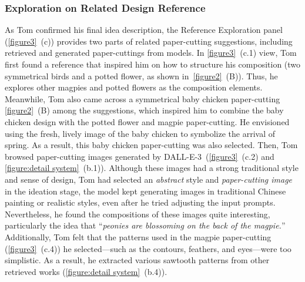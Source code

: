 \subsubsection{Exploration on Related Design Reference}
As Tom confirmed his final idea description, the Reference Exploration panel (\autoref{figure3}~(c)) provides two parts of related paper-cutting suggestions, including retrieved and generated paper-cuttings from models.
In \autoref{figure3}~(c.1) view, Tom first found a reference that inspired him on how to structure his composition (two symmetrical birds and a potted flower, as shown in~\autoref{figure2}~(B)). Thus, he explores other magpies and potted flowers as the composition elements. 
Meanwhile, Tom also came across a symmetrical baby chicken paper-cutting \autoref{figure2}~(B) among the suggestions, which inspired him to combine the baby chicken design with the potted flower and magpie paper-cutting. He envisioned using the fresh, lively image of the baby chicken to symbolize the arrival of spring. As a result, this baby chicken paper-cutting was also selected.
Then, Tom browsed paper-cutting images generated by DALL-E-3~(\autoref{figure3}~(c.2) and \autoref{figure:detail system}~(b.1)). Although these images had a strong traditional style and sense of design, Tom had selected an \textit{abstract} style and \textit{paper-cutting image} in the ideation stage, the model kept generating images in traditional Chinese painting or realistic styles, even after he tried adjusting the input prompts. Nevertheless, he found the compositions of these images quite interesting, particularly the idea that “\textit{peonies are blossoming on the back of the magpie.}”
Additionally, Tom felt that the patterns used in the magpie paper-cutting (\autoref{figure3}~(c.4)) he selected—such as the contours, feathers, and eyes—were too simplistic. As a result, he extracted various sawtooth patterns from other retrieved works (\autoref{figure:detail system}~(b.4)).

